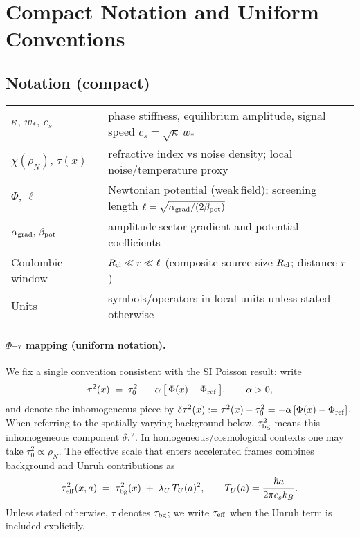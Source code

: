 \documentclass[11pt]{article}
\begin{document}
\section{Compact Notation and Uniform Conventions}
\subsection*{Notation (compact)}
\noindent\begin{tabular}{ll}
  $\kappa,\,w_*,\,c_s$ & phase stiffness, equilibrium amplitude, signal speed $c_s=\sqrt{\kappa}\,w_*$ \\
  $\chi(\rho_N),\,\tau(x)$ & refractive index vs noise density; local noise/temperature proxy \\
  $\Phi,\,\ell$ & Newtonian potential (weak\,field); screening length $\ell=\sqrt{\alpha_{\rm grad}/(2\beta_{\rm pot})}$ \\
  $\alpha_{\rm grad},\,\beta_{\rm pot}$ & amplitude\,sector gradient and potential coefficients \\
  Coulombic window & $R_{\rm cl}\ll r\ll \ell$ (composite source size $R_{\rm cl}$; distance $r$) \\
  Units & symbols/operators in local units unless stated otherwise \\
\end{tabular}

\paragraph{\boldmath $\Phi$–$\tau$ mapping (uniform notation).} We fix a single convention consistent with the SI Poisson result: write
\begin{equation}
  \tau^2(x) \;=\; \tau_0^2 \; -\; \alpha\,\big[\,\Phi(x) - \Phi_{\rm ref}\,\big],\qquad \alpha>0,
\end{equation}
and denote the inhomogeneous piece by $\delta\tau^2(x):=\tau^2(x)-\tau_0^2 = -\alpha\,[\Phi(x)-\Phi_{\rm ref}]$. When referring to the spatially varying background below, $\tau_{\rm bg}^2$ means this inhomogeneous component $\delta\tau^2$. In homogeneous/cosmological contexts one may take $\tau_0^2\propto \rho_N$. The effective scale that enters accelerated frames combines background and Unruh contributions as
\begin{equation}
  \tau_{\rm eff}^2(x,a) \;=\; \tau_{\rm bg}^2(x) \; +\; \lambda_U\,T_U(a)^2,\qquad T_U(a)=\frac{\hbar a}{2\pi c_s k_B}.
\end{equation}
Unless stated otherwise, $\tau$ denotes $\tau_{\rm bg}$; we write $\tau_{\rm eff}$ when the Unruh term is included explicitly.
\end{document}
